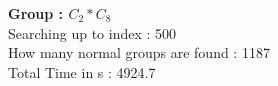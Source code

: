 \textbf{Group : $C_2*C_8$}\\
Searching up to index : 500\\
How many normal groups are found : 1187\\
Total Time in s : 4924.7\\
